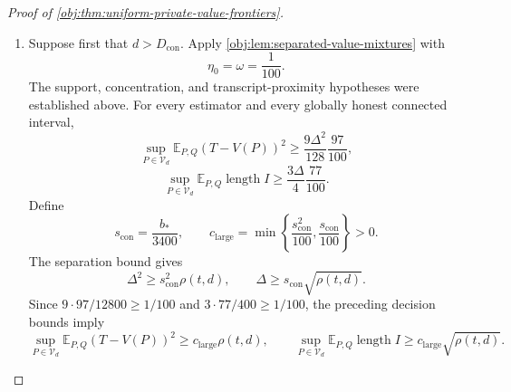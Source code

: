 \documentclass[11pt]{article}
\begin{document}
\begin{proof}[Proof of \cref{obj:thm:uniform-private-value-frontiers}]
\begin{enumerate}
It remains to bound the geometric expression uniformly. In both branches,
\[
kw_{\mathrm{con}}\ge32L,
\qquad
\gamma_{\mathrm{con}}^2=\frac{\alpha^2eL}{kz_*}.
\]
For \(z_*\le1\), the amplitude formula and \(e<3\) give
\[
\alpha^2e\,w_{\mathrm{con}}e^{w_{\mathrm{con}}/2}
=\frac{z_*}{10000}e\,e^{1/2}
\le32z_*.
\]
For \(z_*>1\), use
\[
e^w=e+z_*,
\qquad
w\le2e^{w/2},
\]
the latter following from \(1+w/2\le e^{w/2}\). Thus
\[
we^{w/2}\le2(e+z_*)\le8z_*,
\qquad
\alpha^2e\,we^{w/2}\le32z_*.
\]
Combining either budget inequality with \(kw_{\mathrm{con}}\ge32L\) yields
\[
\gamma_{\mathrm{con}}^2
\le e^{-w_{\mathrm{con}}/2},
\qquad
\gamma_{\mathrm{con}}\le e^{-w_{\mathrm{con}}/4}.
\]
Since \(d\le e^L\) and \(L\ge1\),
\[
d\gamma_{\mathrm{con}}^k
\le de^{-kw_{\mathrm{con}}/4}
\le de^{-8L}
\le e^{-7L}
\le e^{-7}
\le\frac1{100}.
\]
For the last inequality, \(e\ge2\) gives \(e^7\ge128\).
Consequently, for every sequential protocol,
\[
\operatorname{TV}(\mathsf M_0^Q,\mathsf M_1^Q)\le\frac1{100}.
\]
The sampling and randomness assumptions identify these mixtures with the joint seed-transcript mixtures under the fixed sampling scheme; the independent analyst randomizer supplies the decision mixtures required by \cref{obj:lem:separated-value-mixtures}.

\item
Suppose first that \(d>D_{\mathrm{con}}\). Apply \cref{obj:lem:separated-value-mixtures} with
\[
\eta_0=\omega=\frac1{100}.
\]
The support, concentration, and transcript-proximity hypotheses were established above. For every estimator and every globally honest connected interval,
\[
\sup_{P\in\mathcal V_d}
\mathbb E_{P,Q}(T-V(P))^2
\ge\frac{9\Delta^2}{128}\frac{97}{100},
\]
\[
\sup_{P\in\mathcal V_d}
\mathbb E_{P,Q}\operatorname{length}I
\ge\frac{3\Delta}{4}\frac{77}{100}.
\]
Define
\[
s_{\mathrm{con}}=\frac{b_*}{3400},
\qquad
c_{\mathrm{large}}
=\min\left\{\frac{s_{\mathrm{con}}^2}{100},
                 \frac{s_{\mathrm{con}}}{100}\right\}>0.
\]
The separation bound gives
\[
\Delta^2\ge s_{\mathrm{con}}^2\rho(t,d),
\qquad
\Delta\ge s_{\mathrm{con}}\sqrt{\rho(t,d)}.
\]
Since \(9\cdot97/12800\ge1/100\) and
\(3\cdot77/400\ge1/100\), the preceding decision bounds imply
\[
\sup_{P\in\mathcal V_d}\mathbb E_{P,Q}(T-V(P))^2
\ge c_{\mathrm{large}}\rho(t,d),
\qquad
\sup_{P\in\mathcal V_d}\mathbb E_{P,Q}\operatorname{length}I
\ge c_{\mathrm{large}}\sqrt{\rho(t,d)}.
\]


\end{enumerate}
\end{proof}
\end{document}
